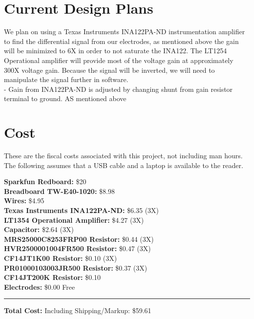\documentclass[11pt, oneside]{article}   	%
\begin{document}
\section{Current Design Plans}
We plan on using a Texas Instruments INA122PA-ND instrumentation amplifier to find the differential signal from our electrodes, as mentioned above the gain will be minimized to 6X in order to not saturate the INA122. \cite{INA122PA-ND} The LT1254 Operational amplifier will provide most of the voltage gain at approximately 300X voltage gain.  Because the signal will be inverted, we will need to manipulate the signal further in software. \\
\noindent - Gain from INA122PA-ND is adjusted by changing shunt from gain resistor terminal to ground. AS mentioned above\\


\section{Cost}
These are the fiscal costs associated with this project, not including man hours. The following assumes that a USB cable and a laptop is available to the reader.

\noindent \textbf{Sparkfun Redboard:} \hfill \$20\\
\textbf{Breadboard TW-E40-1020:} \hfill \$8.98\\
\textbf{Wires:} \hfill \$4.95\\
\textbf{Texas Instruments INA122PA-ND:}  \hfill \$6.35 (3X)\\
\textbf{LT1354 Operational Amplifier:} \hfill \$4.27 (3X)\\
\textbf{Capacitor:} \hfill \$2.64 (3X)\\
\textbf{MRS25000C8253FRP00 Resistor:} \hfill\$0.44 (3X)\\
\textbf{HVR2500001004FR500 Resistor:} \hfill\$0.47 (3X)\\
\textbf{CF14JT1K00 Resistor:} \hfill\$0.10 (3X)\\
\textbf{PR01000103003JR500 Resistor:} \hfill\$0.37 (3X)\\
\textbf{CF14JT200K Resistor:} \hfill \$0.10\\
\textbf{Electrodes:} \hfill\$0.00 Free\\
\rule{\textwidth}{1pt}
\textbf{Total Cost:} \hfill Including Shipping/Markup: \$59.61\\
\pagebreak
\end{document}
